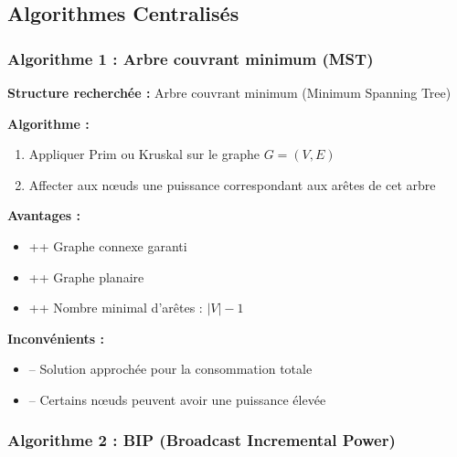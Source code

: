 \documentclass[12pt,a4paper]{article}
\begin{document}
\newpage
\subsection{Algorithmes Centralisés}

\subsubsection{Algorithme 1 : Arbre couvrant minimum (MST)}

\begin{algorithme}
\textbf{Structure recherchée :} Arbre couvrant minimum (Minimum Spanning Tree)

\textbf{Algorithme :}
\begin{enumerate}
    \item Appliquer Prim ou Kruskal sur le graphe $G = (V, E)$
    \item Affecter aux nœuds une puissance correspondant aux arêtes de cet arbre
\end{enumerate}

\textbf{Avantages :}
\begin{itemize}
    \item \textcolor{defvert}{++} Graphe connexe garanti
    \item \textcolor{defvert}{++} Graphe planaire
    \item \textcolor{defvert}{++} Nombre minimal d'arêtes : $|V| - 1$
\end{itemize}

\textbf{Inconvénients :}
\begin{itemize}
    \item \textcolor{importantrouge}{--} Solution approchée pour la consommation totale
    \item \textcolor{importantrouge}{--} Certains nœuds peuvent avoir une puissance élevée
\end{itemize}
\end{algorithme}

\subsubsection{Algorithme 2 : BIP (Broadcast Incremental Power)}
\end{document}
